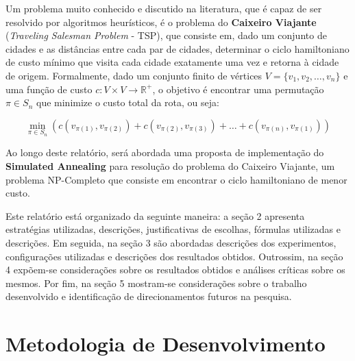 \documentclass[12pt]{article}
\begin{document}
Um problema muito conhecido e discutido na literatura, que é capaz de ser resolvido por algoritmos heurísticos, é o problema do \textbf{Caixeiro Viajante} (\textit{Traveling Salesman Problem} - TSP), que consiste em, dado um conjunto de cidades e as distâncias entre cada par de cidades, determinar o ciclo hamiltoniano de custo mínimo que visita cada cidade exatamente uma vez e retorna à cidade de origem.
%
Formalmente, dado um conjunto finito de vértices \( V = \{v_1, v_2, \dots, v_n\} \) e uma função de custo \( c: V \times V \to \mathbb{R}^+ \), o objetivo é encontrar uma permutação \( \pi \in S_n \) que minimize o custo total da rota, ou seja:

\begin{equation}
\min_{\pi \in S_n} \left( c(v_{\pi(1)}, v_{\pi(2)}) + c(v_{\pi(2)}, v_{\pi(3)}) + \dots + c(v_{\pi(n)}, v_{\pi(1)}) \right)
\end{equation}

Ao longo deste relatório, será abordada uma proposta de implementação do \textbf{Simulated Annealing} para resolução do problema do Caixeiro Viajante, um problema NP-Completo que consiste em encontrar o ciclo hamiltoniano de menor custo.

Este relatório está organizado da seguinte maneira: a seção 2 apresenta estratégias utilizadas, descrições, justificativas de escolhas, fórmulas utilizadas e descrições. Em seguida, na seção 3 são abordadas descrições dos experimentos, configurações utilizadas e descrições dos resultados obtidos. Outrossim, na seção 4 expõem-se considerações sobre os resultados obtidos e análises críticas sobre os mesmos. Por fim, na seção 5 mostram-se considerações sobre o trabalho desenvolvido e identificação de direcionamentos futuros na pesquisa.


\section{Metodologia de Desenvolvimento}
\label{sec:metodologia_de_desenvolvimento}
\end{document}
